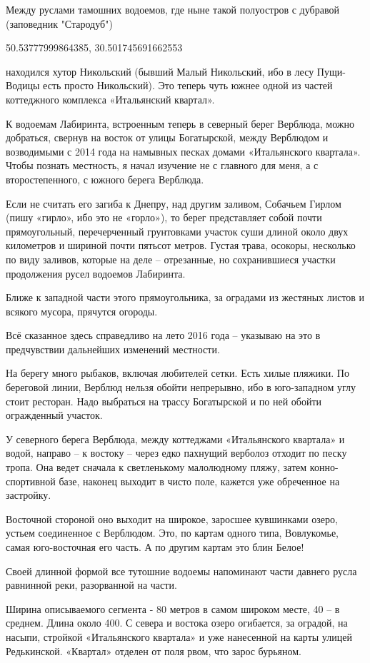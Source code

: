 Между руслами тамошних водоемов, где ныне такой полуостров с дубравой (заповедник "Стародуб")

50.53777999864385, 30.501745691662553

находился хутор Никольский (бывший Малый Никольский, ибо в лесу Пущи-Водицы есть просто Никольский). Это теперь чуть южнее одной из частей коттеджного комплекса «Итальянский квартал».

К водоемам Лабиринта, встроенным теперь в северный берег Верблюда, можно добраться, свернув на восток от улицы Богатырской, между Верблюдом и возводимыми с 2014 года на намывных песках домами «Итальянского квартала». Чтобы познать местность, я начал изучение не с главного для меня, а с второстепенного, с южного берега Верблюда.

Если не считать его загиба к Днепру, над другим заливом, Собачьем Гирлом (пишу «гирло», ибо это не «горло»), то берег представляет собой почти прямоугольный, перечерченный грунтовками участок суши длиной около двух километров и шириной почти пятьсот метров. Густая трава, осокоры, несколько по виду заливов, которые на деле – отрезанные, но сохранившиеся участки продолжения русел 
водоемов Лабиринта.

Ближе к западной части этого прямоугольника, за оградами из жестяных листов и всякого мусора, прячутся огороды.

Всё сказанное здесь справедливо на лето 2016 года – указываю на это в предчувствии дальнейших изменений местности.

На берегу много рыбаков, включая любителей сетки. Есть хилые пляжики. По береговой линии, Верблюд нельзя обойти непрерывно, ибо в юго-западном углу стоит ресторан. Надо выбраться на трассу Богатырской и по ней обойти огражденный участок.

У северного берега Верблюда, между коттеджами «Итальянского квартала» и водой, направо – к востоку – через едко пахнущий верболоз отходит по песку тропа. Она ведет сначала к светленькому малолюдному пляжу, затем конно-спортивной базе, наконец выходит в чисто поле, кажется уже обреченное на застройку.

Восточной стороной оно выходит на широкое, заросшее кувшинками озеро, устьем соединенное с Верблюдом. Это, по картам одного типа, Вовлукомье, самая юго-восточная его часть. А по другим картам это блин Белое!

Своей длинной формой все тутошние водоемы напоминают части давнего русла равнинной реки, разорванной на части. 

Ширина описываемого сегмента - 80 метров в самом широком месте, 40 – в среднем. Длина около 400. С севера и востока озеро огибается, за оградой, на насыпи, стройкой «Итальянского квартала» и уже нанесенной на карты улицей Редькинской. «Квартал» отделен от поля рвом, что зарос бурьяном.

